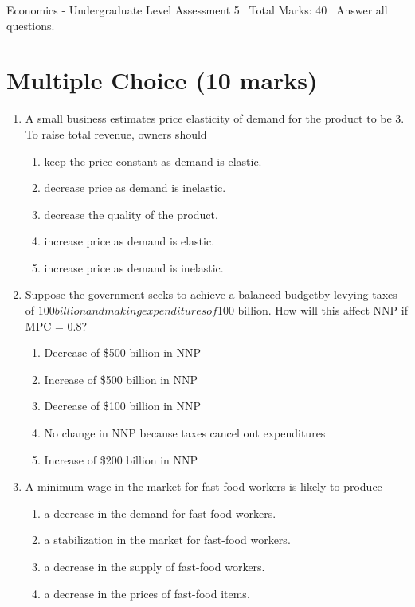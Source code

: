 \documentclass[12pt]{article}
\begin{document}
\begin{center}
Economics - Undergraduate Level Assessment 5 \
Total Marks: 40 \
Answer all questions.
\end{center}

\section*{Multiple Choice (10 marks)}
\begin{enumerate}[label=\arabic*.]
\item A small business estimates price elasticity of demand for the product to be 3. To raise
total revenue, owners should
\begin{enumerate}[label=(\alph*)]
    \item keep the price constant as demand is elastic.
    \item decrease price as demand is inelastic.
    \item decrease the quality of the product.
    \item increase price as demand is elastic.
    \item increase price as demand is inelastic.
\end{enumerate}
\item Suppose the government seeks to achieve a balanced budgetby levying taxes of $100 billion
and making expendituresof $100 billion. How will this affect NNP if MPC = 0.8?
\begin{enumerate}[label=(\alph*)]
    \item Decrease of \$500 billion in NNP
    \item Increase of \$500 billion in NNP
    \item Decrease of \$100 billion in NNP
    \item No change in NNP because taxes cancel out expenditures
    \item Increase of \$200 billion in NNP
\end{enumerate}
\item A minimum wage in the market for fast-food workers is likely to produce
\begin{enumerate}[label=(\alph*)]
    \item a decrease in the demand for fast-food workers.
    \item a stabilization in the market for fast-food workers.
    \item a decrease in the supply of fast-food workers.
    \item a decrease in the prices of fast-food items.

\end{enumerate}
\end{enumerate}
\end{document}

